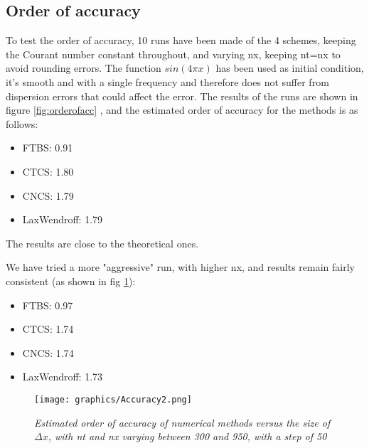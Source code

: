\subsection{Order of accuracy}
To test the order of accuracy, 10 runs have been made of the 4 schemes, keeping the Courant number constant throughout, and varying nx, keeping nt=nx to avoid rounding errors. The function $sin(4\pi x)$ has been used as initial condition, it's smooth and with a single frequency and therefore does not suffer from dispersion errors that could affect the error.
The results of the runs are shown in figure \ref{fig:orderofacc} , and the estimated order of accuracy for the methods is as follows:
\begin{itemize}
\item FTBS: 0.91
\item CTCS: 1.80
\item CNCS: 1.79
\item LaxWendroff: 1.79
\end{itemize}
The results are close to the theoretical ones.

We have tried a more "aggressive" run, with higher nx, and results remain fairly consistent (as shown in fig \ref{fig:orderofacc2}):
\begin{itemize}
	\item FTBS: 0.97
	\item CTCS: 1.74
	\item CNCS: 1.74
	\item LaxWendroff: 1.73
\end{itemize}

\begin{figure}[H]
	\begin{center}
		\texttt{[image: graphics/Accuracy2.png]}
	\end{center}%
	\caption[Order of accuracy of numerical methods]{ \em Estimated order of accuracy of numerical methods versus the size of $\Delta x$, with nt and nx varying between 300 and 950, with a step of 50}
	\label{fig:orderofacc2}
\end{figure}



